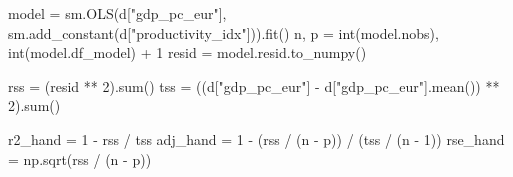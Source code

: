 \documentclass[
  letterpaper,
  10pt,
  twoside,
  openright,
  numbers=noenddot,
  chapterprefix=true]{scrbook}
\newenvironment{Shaded}{}{}
\newcommand{\BuiltInTok}[1]{\textcolor[rgb]{0.84,0.23,0.29}{#1}}
\newcommand{\DecValTok}[1]{\textcolor[rgb]{0.00,0.36,0.77}{#1}}
\newcommand{\NormalTok}[1]{\textcolor[rgb]{0.14,0.16,0.18}{#1}}
\newcommand{\OperatorTok}[1]{\textcolor[rgb]{0.14,0.16,0.18}{#1}}
\newcommand{\StringTok}[1]{\textcolor[rgb]{0.01,0.18,0.38}{#1}}
\begin{document}
\label{check-fit}
\begin{Shaded}
\begin{Highlighting}[]
\NormalTok{model }\OperatorTok{=}\NormalTok{ sm.OLS(d[}\StringTok{"gdp\_pc\_eur"}\NormalTok{], sm.add\_constant(d[}\StringTok{"productivity\_idx"}\NormalTok{])).fit()}
\NormalTok{n, p }\OperatorTok{=} \BuiltInTok{int}\NormalTok{(model.nobs), }\BuiltInTok{int}\NormalTok{(model.df\_model) }\OperatorTok{+} \DecValTok{1}
\NormalTok{resid }\OperatorTok{=}\NormalTok{ model.resid.to\_numpy()}

\NormalTok{rss }\OperatorTok{=}\NormalTok{ (resid }\OperatorTok{**} \DecValTok{2}\NormalTok{).}\BuiltInTok{sum}\NormalTok{()}
\NormalTok{tss }\OperatorTok{=}\NormalTok{ ((d[}\StringTok{"gdp\_pc\_eur"}\NormalTok{] }\OperatorTok{{-}}\NormalTok{ d[}\StringTok{"gdp\_pc\_eur"}\NormalTok{].mean()) }\OperatorTok{**} \DecValTok{2}\NormalTok{).}\BuiltInTok{sum}\NormalTok{()}

\NormalTok{r2\_hand }\OperatorTok{=} \DecValTok{1} \OperatorTok{{-}}\NormalTok{ rss }\OperatorTok{/}\NormalTok{ tss}
\NormalTok{adj\_hand }\OperatorTok{=} \DecValTok{1} \OperatorTok{{-}}\NormalTok{ (rss }\OperatorTok{/}\NormalTok{ (n }\OperatorTok{{-}}\NormalTok{ p)) }\OperatorTok{/}\NormalTok{ (tss }\OperatorTok{/}\NormalTok{ (n }\OperatorTok{{-}} \DecValTok{1}\NormalTok{))}
\NormalTok{rse\_hand }\OperatorTok{=}\NormalTok{ np.sqrt(rss }\OperatorTok{/}\NormalTok{ (n }\OperatorTok{{-}}\NormalTok{ p))}


\end{Highlighting}
\end{Shaded}
\end{document}
